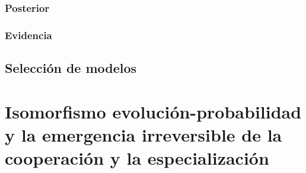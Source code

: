 \documentclass[a4paper,10pt]{book}
\theoremstyle{definition}
\begin{document}
\subsection{Posterior}

\subsection{Evidencia}




\section{Selección de modelos}
































































\chapter{Isomorfismo evolución-probabilidad y la emergencia irreversible de la cooperación y la especialización}
\end{document}

